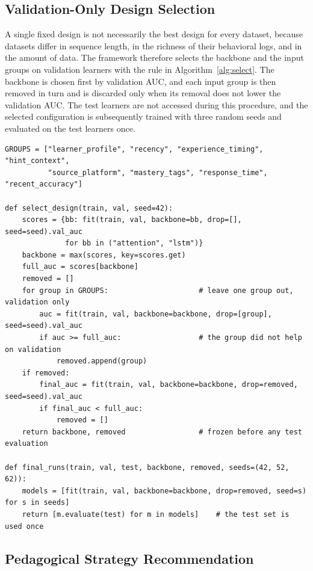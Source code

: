 \documentclass[11pt]{article}
\begin{document}
\subsection{Validation-Only Design Selection}

A single fixed design is not necessarily the best design for every dataset, because datasets differ in sequence length, in the richness of their behavioral logs, and in the amount of data. The framework therefore selects the backbone and the input groups on validation learners with the rule in Algorithm~\ref{alg:select}. The backbone is chosen first by validation AUC, and each input group is then removed in turn and is discarded only when its removal does not lower the validation AUC. The test learners are not accessed during this procedure, and the selected configuration is subsequently trained with three random seeds and evaluated on the test learners once.

\begin{lstlisting}[caption={Validation-only selection of the backbone and the input groups.},label={alg:select}]
GROUPS = ["learner_profile", "recency", "experience_timing", "hint_context",
          "source_platform", "mastery_tags", "response_time", "recent_accuracy"]

def select_design(train, val, seed=42):
    scores = {bb: fit(train, val, backbone=bb, drop=[], seed=seed).val_auc
              for bb in ("attention", "lstm")}
    backbone = max(scores, key=scores.get)
    full_auc = scores[backbone]
    removed = []
    for group in GROUPS:                     # leave one group out, validation only
        auc = fit(train, val, backbone=backbone, drop=[group], seed=seed).val_auc
        if auc >= full_auc:                  # the group did not help on validation
            removed.append(group)
    if removed:
        final_auc = fit(train, val, backbone=backbone, drop=removed, seed=seed).val_auc
        if final_auc < full_auc:
            removed = []
    return backbone, removed                 # frozen before any test evaluation

def final_runs(train, val, test, backbone, removed, seeds=(42, 52, 62)):
    models = [fit(train, val, backbone=backbone, drop=removed, seed=s) for s in seeds]
    return [m.evaluate(test) for m in models]    # the test set is used once
\end{lstlisting}

\subsection{Pedagogical Strategy Recommendation}
\end{document}
